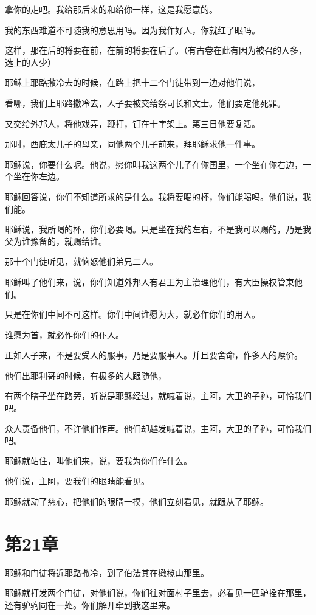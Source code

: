 \documentclass[12pt,oneside]{book}
\begin{document}
拿你的走吧。我给那后来的和给你一样，这是我愿意的。

我的东西难道不可随我的意思用吗。因为我作好人，你就红了眼吗。

这样，那在后的将要在前，在前的将要在后了。（有古卷在此有因为被召的人多，选上的人少）

耶稣上耶路撒冷去的时候，在路上把十二个门徒带到一边对他们说，

看哪，我们上耶路撒冷去，人子要被交给祭司长和文士。他们要定他死罪。

又交给外邦人，将他戏弄，鞭打，钉在十字架上。第三日他要复活。

那时，西庇太儿子的母亲，同他两个儿子前来，拜耶稣求他一件事。

耶稣说，你要什么呢。他说，愿你叫我这两个儿子在你国里，一个坐在你右边，一个坐在你左边。

耶稣回答说，你们不知道所求的是什么。我将要喝的杯，你们能喝吗。他们说，我们能。

耶稣说，我所喝的杯，你们必要喝。只是坐在我的左右，不是我可以赐的，乃是我父为谁豫备的，就赐给谁。

那十个门徒听见，就恼怒他们弟兄二人。

耶稣叫了他们来，说，你们知道外邦人有君王为主治理他们，有大臣操权管束他们。

只是在你们中间不可这样。你们中间谁愿为大，就必作你们的用人。

谁愿为首，就必作你们的仆人。

正如人子来，不是要受人的服事，乃是要服事人。并且要舍命，作多人的赎价。

他们出耶利哥的时候，有极多的人跟随他，

有两个瞎子坐在路旁，听说是耶稣经过，就喊着说，主阿，大卫的子孙，可怜我们吧。

众人责备他们，不许他们作声。他们却越发喊着说，主阿，大卫的子孙，可怜我们吧。

耶稣就站住，叫他们来，说，要我为你们作什么。

他们说，主阿，要我们的眼睛能看见。

耶稣就动了慈心，把他们的眼睛一摸，他们立刻看见，就跟从了耶稣。

\chapter{第21章}
耶稣和门徒将近耶路撒冷，到了伯法其在橄榄山那里。

耶稣就打发两个门徒，对他们说，你们往对面村子里去，必看见一匹驴拴在那里，还有驴驹同在一处。你们解开牵到我这里来。
\end{document}
